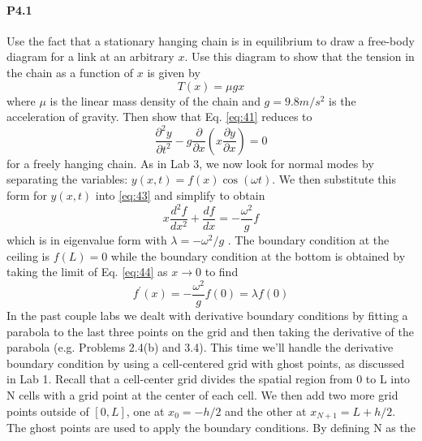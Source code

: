 \paragraph*{P4.1}
Use the fact that a stationary hanging chain is in equilibrium to draw a
free-body diagram for a link at an arbitrary $x$. Use this diagram to show that
the tension in the chain as a function of $x$ is given by
	\begin{equation}\label{eq:42}
		T(x) = \mu g x
				\end{equation}		
				where $\mu$ is the linear mass density of the chain and $g = 9.8 m/s^2$
is the acceleration of gravity. Then show that Eq. \eqref{eq:41} reduces to	
	\begin{equation}\label{eq:43}
		 \frac{\partial^2 y}{\partial t^2} - g\frac{\partial}{\partial x}(x\frac{\partial y}{\partial x}) = 0
				\end{equation}	
				for a freely hanging chain.
			As in Lab 3, we now look for normal modes by separating the variables:
$y(x,t) = f(x)\cos(\omega t)$. We then substitute this form for $y(x,t)$ into \eqref{eq:43} and simplify to obtain	
		\begin{equation}\label{eq:44}
		 x \frac{d^2 f}{dx^2}+\frac{df}{dx} = - \frac{\omega^2}{g}f
				\end{equation}		
				which is in eigenvalue form with $ \lambda = −\omega^2/g$ . The boundary condition at the
ceiling is $f (L) = 0$ while the boundary condition at the bottom is obtained by
taking the limit of Eq. \eqref{eq:44} as $x \rightarrow 0$ to find
	\begin{equation}\label{eq:45}
		f^\prime(x) = - \frac{\omega^2}{g}f(0) = \lambda f(0)
				\end{equation}		
				In the past couple labs we dealt with derivative boundary conditions by fitting
a parabola to the last three points on the grid and then taking the derivative of
the parabola (e.g. Problems 2.4(b) and 3.4). This time we\rq ll handle the derivative
boundary condition by using a cell-centered grid with ghost points, as discussed
in Lab 1. Recall that a cell-center grid divides the spatial region from 0 to L into
N cells with a grid point at the center of each cell. We then add two more grid
points outside of $[0,L]$, one at $x_0  = −h/2$ and the other at $x_{N+1} = L + h/2$. The
ghost points are used to apply the boundary conditions. By defining N as the
